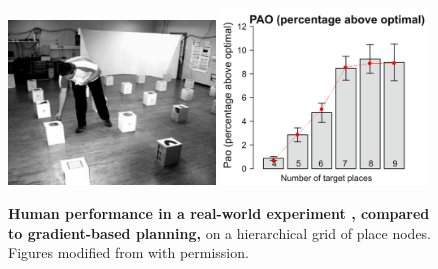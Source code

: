 \begin{figure}[!ht]
	\begin{center}
		\includegraphics[width=0.49\textwidth]{img/wienerexp}
		\includegraphics[width=0.49\textwidth]{img/wieneretal2009_spatial_tsp_comparison.png}
	\end{center}
	\caption[Human performance in a real-world experiment]{
		{\bf Human performance in a real-world experiment \citep{Wiener2009}, compared to gradient-based planning,} on a hierarchical grid of place nodes. Figures modified from \citep{Wiener2009} with permission.
	}
	\label{tsp2}
\end{figure}


